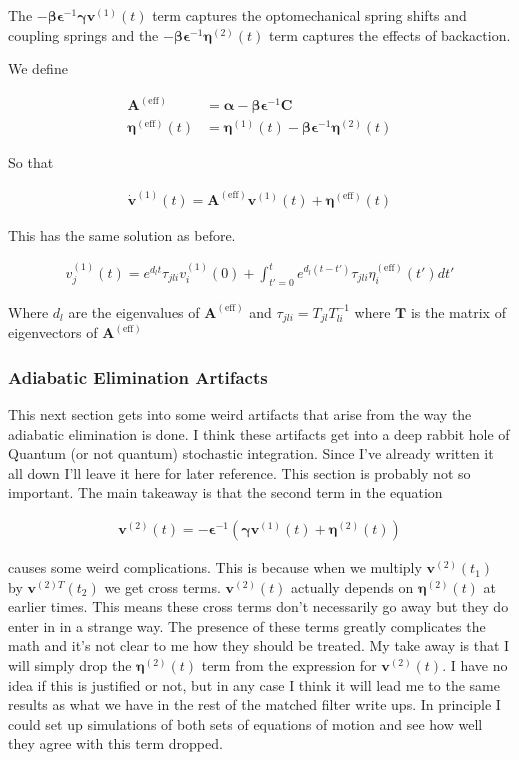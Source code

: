 \documentclass[12pt]{article}
\newcommand{\bv}[1]{\boldsymbol{#1}}
\begin{document}
The $-\bv{\beta}\bv{\epsilon}^{-1}\bv{\gamma}\bv{v}^{(1)}(t)$ term captures the optomechanical spring shifts and coupling springs and the $-\bv{\beta}\bv{\epsilon}^{-1}\bv{\eta}^{(2)}(t)$ term captures the effects of backaction.

We define

\begin{align}
\bv{A}^{(\text{eff})} &= \bv{\alpha}-\bv{\beta}\bv{\epsilon}^{-1}\bv{C}\\
\bv{\eta}^{(\text{eff})}(t) &= \bv{\eta}^{(1)}(t) - \bv{\beta}\bv{\epsilon}^{-1}\bv{\eta}^{(2)}(t)
\end{align}

So that

\begin{align}
\dot{\bv{v}}^{(1)}(t) = \bv{A}^{(\text{eff})} \bv{v}^{(1)}(t) + \bv{\eta}^{(\text{eff})}(t)
\end{align}

This has the same solution as before.

\begin{align}
v^{(1)}_{j}(t) = e^{d_l t} \tau_{jli} v^{(1)}_{i}(0) + \int_{t'=0}^t e^{d_l(t-t')} \tau_{jli}\eta^{(\text{eff})}_{i}(t') dt'
\end{align}

Where $d_l$ are the eigenvalues of $\bv{A}^{(\text{eff})}$ and $\tau_{jli} = T_{jl}T^{-1}_{li}$ where $\bv{T}$ is the matrix of eigenvectors of $\bv{A}^{(\text{eff})}$

\subsubsection{Adiabatic Elimination Artifacts}

This next section gets into some weird artifacts that arise from the way the adiabatic elimination is done. I think these artifacts get into a deep rabbit hole of Quantum (or not quantum) stochastic integration. Since I've already written it all down I'll leave it here for later reference. This section is probably not so important. The main takeaway is that the second term in the equation 

\begin{align}
\bv{v}^{(2)}(t) = -\bv{\epsilon}^{-1}(\bv{\gamma} \bv{v}^{(1)}(t) + \bv{\eta}^{(2)}(t))
\end{align}

causes some weird complications. This is because when we multiply $\bv{v}^{(2)}(t_1)$ by $\bv{v}^{(2)T}(t_2)$ we get cross terms. $\bv{v}^{(2)}(t)$ actually depends on $\bv{\eta}^{(2)}(t)$ at earlier times. This means these cross terms don't necessarily go away but they do enter in in a strange way. The presence of these terms greatly complicates the math and it's not clear to me how they should be treated. My take away is that I will simply drop the $\bv{\eta}^{(2)}(t)$ term from the expression for $\bv{v}^{(2)}(t)$. I have no idea if this is justified or not, but in any case I think it will lead me to the same results as what we have in the rest of the matched filter write ups. In principle I could set up simulations of both sets of equations of motion and see how well they agree with this term dropped.
\end{document}
